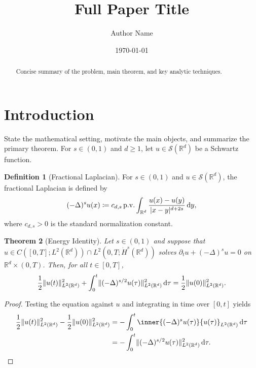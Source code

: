 \documentclass[11pt,reqno]{amsart}
\title[Short Running Title]{Full Paper Title}
\author{Author Name}
\date{\today}
\DeclarePairedDelimiter{\abs}{\lvert}{\rvert}
\DeclarePairedDelimiter{\norm}{\lVert}{\rVert}
\newcommand{\dd}{\mathop{}\!\mathrm{d}}
\DeclareMathOperator{\pv}{p.v.}
\newcommand{\R}{\mathbb{R}}
\newcommand{\flap}{(-\Delta)^{s}}
\theoremstyle{plain}
\newtheorem{theorem}{Theorem}[section]
\theoremstyle{definition}
\newtheorem{definition}[theorem]{Definition}
\theoremstyle{remark}
\numberwithin{equation}{section}
\begin{document}
\begin{abstract}
Concise summary of the problem, main theorem, and key analytic techniques.
\end{abstract}

\maketitle

\section{Introduction}\label{sec:intro}

State the mathematical setting, motivate the main objects, and summarize the primary theorem.
For $s \in (0, 1)$ and $d \ge 1$, let $u \in \mathcal{S}(\R^d)$ be a Schwartz function.

\begin{definition}[Fractional Laplacian]\label{def:flap}
For $s \in (0, 1)$ and $u \in \mathcal{S}(\R^d)$, the fractional Laplacian is defined by
\begin{equation}\label{eq:flap_pv}
  \flap u(x) \coloneqq c_{d,s} \pv \int_{\R^d} \frac{u(x) - u(y)}{\abs{x - y}^{d + 2s}} \dd y,
\end{equation}
where $c_{d,s} > 0$ is the standard normalization constant.
\end{definition}

\begin{theorem}[Energy Identity]\label{thm:energy}
Let $s \in (0, 1)$ and suppose that $u \in C([0, T]; L^2(\R^d)) \cap L^2(0, T; \dot{H}^s(\R^d))$
solves $\partial_t u + \flap u = 0$ on $\R^d \times (0, T)$. Then, for all $t \in [0, T]$,
\begin{equation}\label{eq:energy_id}
  \frac{1}{2}\norm{u(t)}_{L^2(\R^d)}^2
  + \int_0^t \norm{(-\Delta)^{s/2} u(\tau)}_{L^2(\R^d)}^2 \dd\tau
  = \frac{1}{2}\norm{u(0)}_{L^2(\R^d)}^2.
\end{equation}
\end{theorem}

\begin{proof}
Testing the equation against $u$ and integrating in time over $[0, t]$ yields
\begin{align*}
  \frac{1}{2}\norm{u(t)}_{L^2(\R^d)}^2 - \frac{1}{2}\norm{u(0)}_{L^2(\R^d)}^2
  &= -\int_0^t \inner{\flap u(\tau)}{u(\tau)}_{L^2(\R^d)} \dd\tau \\
  &= -\int_0^t \norm{(-\Delta)^{s/2} u(\tau)}_{L^2(\R^d)}^2 \dd\tau. \qedhere
\end{align*}
\end{proof}
\end{document}
